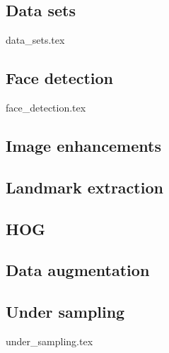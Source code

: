 \subsection{Data sets}
{data_sets.tex}
\subsection{Face detection}
{face_detection.tex}

\subsection{Image enhancements}


\subsection{Landmark extraction}


\subsection{HOG}


\subsection{Data augmentation}


\subsection{Under sampling}
{under_sampling.tex}